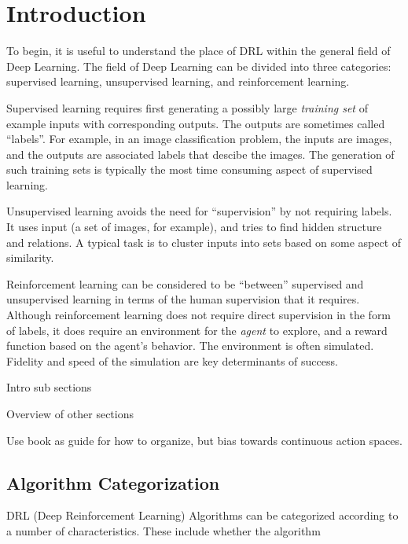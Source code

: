 \documentclass[acmlarge,screen]{acmart}
\begin{document}
\section{Introduction}

To begin, it is useful to understand the place of DRL within the general field of Deep Learning.
The field of Deep Learning can be divided into three categories: supervised learning, unsupervised learning, and
reinforcement learning.

Supervised learning requires first generating a possibly large \textit{training set} of example inputs with corresponding outputs.
The outputs are sometimes called ``labels''.
For example, in an image classification problem, the inputs are images, and the outputs are associated labels that
descibe the images.
The generation of such training sets is typically the most time consuming aspect of supervised learning.

Unsupervised learning avoids the need for ``supervision'' by not requiring labels.
It uses input (a set of images, for example), and tries to find hidden structure and relations.
A typical task is to cluster inputs into sets based on some aspect of similarity.

Reinforcement learning can be considered to be ``between'' supervised and unsupervised learning in terms of the human supervision
that it requires.
Although reinforcement learning does not require direct supervision in the form of labels, it does require an environment for the
\textit{agent} to explore, and a reward function based on the agent's behavior.
The environment is often simulated.
Fidelity and speed of the simulation are key determinants of success.





Intro sub sections

Overview of other sections

Use book as guide for how to organize, but bias towards continuous action spaces.





\subsection{Algorithm Categorization}

DRL (Deep Reinforcement Learning) Algorithms can be categorized according to a number of characteristics.
These include whether the algorithm 
\end{document}
